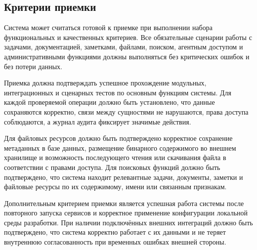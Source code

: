 \textheadingsep
\subsection{Критерии приемки}

\headingtextsep

Система может считаться готовой к приемке при выполнении набора функциональных и качественных критериев. Все обязательные сценарии работы с задачами, документацией, заметками, файлами, поиском, агентным доступом и административными функциями должны выполняться без критических ошибок и без потери данных.

Приемка должна подтверждать успешное прохождение модульных, интеграционных и сценарных тестов по основным функциям системы. Для каждой проверяемой операции должно быть установлено, что данные сохраняются корректно, связи между сущностями не нарушаются, права доступа соблюдаются, а журнал аудита фиксирует значимые действия.

Для файловых ресурсов должно быть подтверждено корректное сохранение метаданных в базе данных, размещение бинарного содержимого во внешнем хранилище и возможность последующего чтения или скачивания файла в соответствии с правами доступа. Для поисковых функций должно быть подтверждено, что система находит релевантные задачи, документы, заметки и файловые ресурсы по их содержимому, имени или связанным признакам.

Дополнительным критерием приемки является успешная работа системы после повторного запуска сервисов и корректное применение конфигурации локальной среды разработки. При наличии подключённых внешних интеграций должно быть подтверждено, что система корректно работает с их данными и не теряет внутреннюю согласованность при временных ошибках внешней стороны.